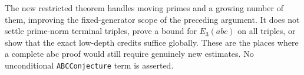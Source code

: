 The new restricted theorem handles moving primes and a growing number of them, improving the fixed-generator scope of the preceding argument. It does not settle prime-norm terminal triples, prove a bound for $E_3(abc)$ on all triples, or show that the exact low-depth credits suffice globally. These are the places where a complete abc proof would still require genuinely new estimates. No unconditional \texttt{ABCConjecture} term is asserted.



\endgroup
